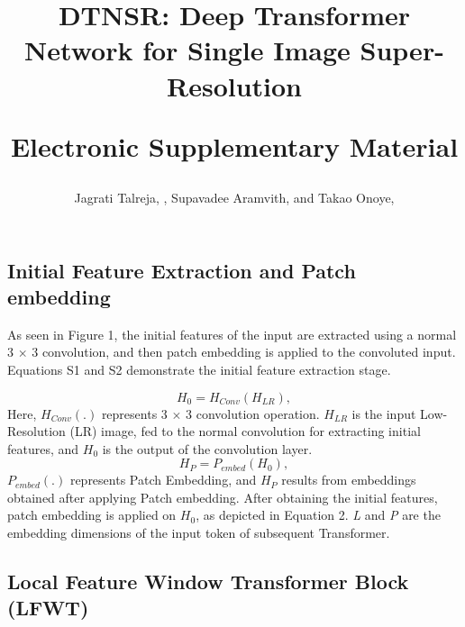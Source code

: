 \documentclass[journal]{IEEEtran}
\begin{document}
\title{DTNSR: Deep Transformer Network for Single Image Super-Resolution \\ 

\vspace{\baselineskip}

\large Electronic Supplementary Material}



\author{Jagrati Talreja, , Supavadee Aramvith,  and Takao Onoye, }


\maketitle





\subsection{Initial Feature Extraction and Patch embedding}

As seen in Figure 1, the initial features of the input are extracted using a normal 3 $\times$ 3 convolution, and then patch embedding is applied to the convoluted input. Equations S1 and S2 demonstrate the initial feature extraction stage.

\begin{equation}
{H_{0}}= {H_{Conv}}({H_{LR}}), \tag{S1}
\end{equation}
Here, ${H_{Conv}}$$(.)$ represents 3 $\times$ 3 convolution operation. ${H_{LR}}$ is the input Low-Resolution (LR) image, fed to the normal convolution for extracting initial features, and ${H_{0}}$ is the output of the convolution layer. 
\begin{equation}
{H_{P}}= {P_{embed}}({H_{0}}),  \tag{S2}
\end{equation}
${P_{embed}}$$(.)$ represents Patch Embedding, and ${H_{P}}$ results from embeddings obtained after applying Patch embedding. After obtaining the initial features, patch embedding is applied on ${H_{0}}$, as depicted in Equation 2. \textit{L} and \textit{P} are the embedding dimensions of the input token of subsequent Transformer.

\subsection{Local Feature Window Transformer Block (LFWT)}
\end{document}
